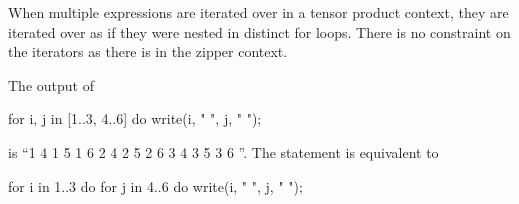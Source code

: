 When multiple expressions are iterated over in a tensor product
context, they are iterated over as if they were nested in distinct for
loops.  There is no constraint on the iterators as there is in the
zipper context.

\begin{example}
The output of
\begin{chapel}
for i, j in [1..3, 4..6] do
  write(i, " ", j, " ");
\end{chapel}
is ``1 4 1 5 1 6 2 4 2 5 2 6 3 4 3 5 3 6 ''. The statement is
equivalent to
\begin{chapel}
for i in 1..3 do
  for j in 4..6 do
    write(i, " ", j, " ");
\end{chapel}
\end{example}
